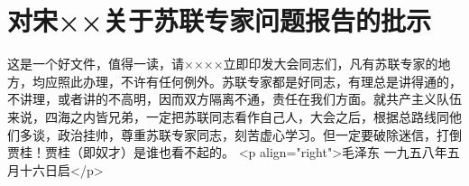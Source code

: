 \section[对宋××关于苏联专家问题报告的批示（一九五八年五月十六日）]{对宋××关于苏联专家问题报告的批示}


这是一个好文件，值得一读，请××××立即印发大会同志们，凡有苏联专家的地方，均应照此办理，不许有任何例外。苏联专家都是好同志，有理总是讲得通的，不讲理，或者讲的不高明，因而双方隔离不通，责任在我们方面。就共产主义队伍来说，四海之内皆兄弟，一定把苏联同志看作自己人，大会之后，根据总路线同他们多谈，政治挂帅，尊重苏联专家同志，刻苦虚心学习。但一定要破除迷信，打倒贾桂！贾桂（即奴才）是谁也看不起的。
<p align="right">毛泽东
一九五八年五月十六日启</p>


